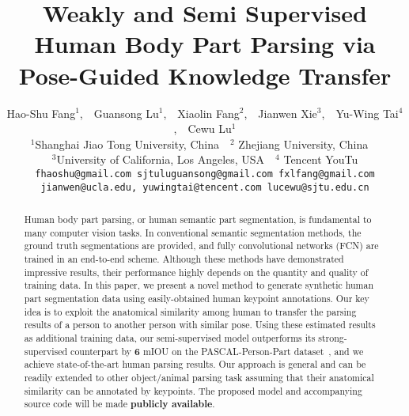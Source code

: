 \documentclass[10pt,twocolumn,letterpaper]{article}
\begin{document}
\title{Weakly and Semi Supervised Human Body Part Parsing via Pose-Guided Knowledge Transfer}

\author{Hao-Shu Fang$^{1}$,~~Guansong Lu$^{1}$,~~Xiaolin Fang$^{2}$\footnotemark[1],~~Jianwen Xie$^{3}$,~~Yu-Wing Tai$^{4}$,~~Cewu Lu$^{1}$\footnotemark[2]\\
$^{1}$Shanghai Jiao Tong University, China~~$^{2}$ Zhejiang University, China~~\\
$^{3}$University of California, Los Angeles, USA~~$^{4}$ Tencent YouTu\\
{\tt\small fhaoshu@gmail.com sjtuluguansong@gmail.com fxlfang@gmail.com}\\
{\tt\small jianwen@ucla.edu, yuwingtai@tencent.com lucewu@sjtu.edu.cn}}


\maketitle
\renewcommand{\thefootnote}{\fnsymbol{footnote}}
\begin{abstract}
Human body part parsing, or human semantic part segmentation, is fundamental to many computer vision tasks. In conventional semantic segmentation methods, the ground truth segmentations are provided, and fully convolutional networks (FCN) are trained in an end-to-end scheme. Although these methods have demonstrated impressive results, their performance highly depends on the quantity and quality of training data. In this paper, we present a novel method to generate synthetic human part segmentation data using easily-obtained human keypoint annotations. Our key idea is to exploit the anatomical similarity among human to transfer the parsing results of a person to another person with similar pose. Using these estimated results as additional training data, our semi-supervised model outperforms its strong-supervised counterpart by $\mathbf{6}$ mIOU on the PASCAL-Person-Part dataset~\cite{chen2014detect}, and we achieve state-of-the-art human parsing results. Our approach is general and can be readily extended to other object/animal parsing task assuming that their anatomical similarity can be annotated by keypoints. The proposed model and accompanying source code will be made \textbf{publicly available}.
\end{abstract}
\end{document}
